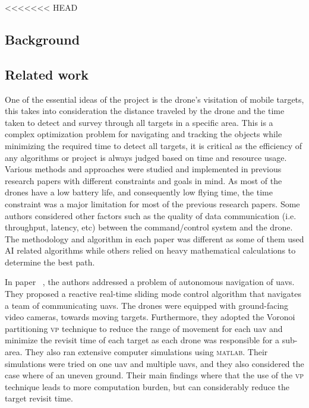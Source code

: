 \documentclass[../main.tex]{subfiles}
\begin{document}
<<<<<<< HEAD
	
	\subsection{Background}
	
	\blindtext
	
	\subsection{Related work}
	
	
	
	One of the essential ideas of the project is the drone's visitation of mobile 
	targets, this takes into consideration the distance traveled by the drone and the time taken to detect and survey through all targets in a specific area.
	This is a complex optimization problem for navigating and tracking the objects while minimizing the required time to detect all targets,
	it is critical as the efficiency of any algorithms 
	or project is always judged based on time and resource usage.
	Various methods and approaches were studied and implemented 
	in previous research papers with different constraints and 
	goals in mind.
	As most of the drones have a low battery life, 
	and consequently low flying time, the time constraint was a major limitation 
	for most of the previous research papers. 
	Some authors considered other factors such as the quality 
	of data communication (i.e. throughput, latency, etc) between the command/control 
	system and the drone.
	The methodology and algorithm in each paper was different 
	as some of them used AI related algorithms while others relied 
	on heavy mathematical calculations to determine the best path.
	
	In paper ~\cite{hua20}, the authors \citeauthor{hua20} 
	addressed a problem of autonomous navigation of \glspl{uav}. 
	They proposed a reactive real-time sliding mode control algorithm 
	that navigates a team of communicating \glspl{uav}.
	The drones were equipped with ground-facing video cameras,
	towards moving targets. 
	Furthermore, they adopted the Voronoi partitioning \textsc{vp} technique 
	to reduce the range of movement for each \gls{uav} and 
	minimize the revisit time of each target as each drone was responsible 
	for a sub-area.
	They also ran extensive computer simulations using \textsc{matlab}. 
	Their simulations were tried on one \gls{uav} and multiple \glspl{uav},
	and they also considered the case where of an uneven ground. 
	Their main findings where that the use of the \textsc{vp} technique 
	leads to more computation burden, but can considerably reduce the target 
	revisit time.
	
\end{document}
